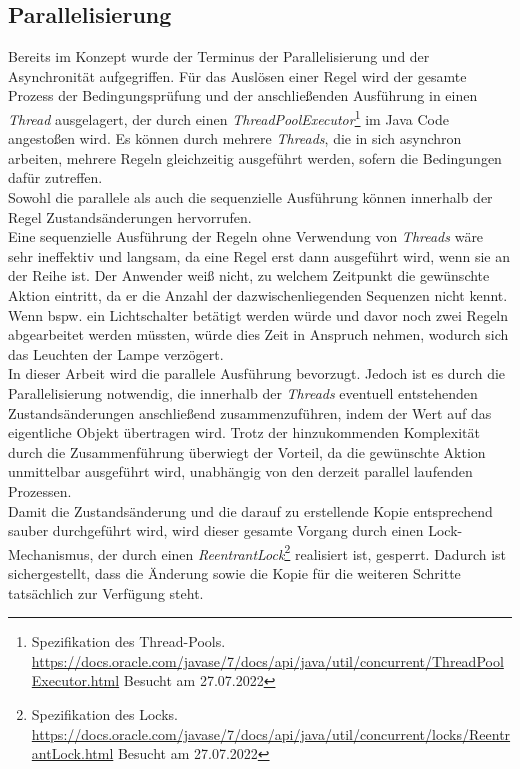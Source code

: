 \subsection{Parallelisierung}
\label{subsec:parallelisierung}
    Bereits im Konzept wurde der Terminus der Parallelisierung und der Asynchronität aufgegriffen. Für das Auslösen einer Regel wird der gesamte Prozess der 
    Bedingungsprüfung und der anschließenden Ausführung in einen \textit{Thread} ausgelagert, der durch einen 
    \textit{ThreadPoolExecutor}\footnote{Spezifikation des Thread-Pools. \url{https://docs.oracle.com/javase/7/docs/api/java/util/concurrent/ThreadPoolExecutor.html} Besucht am 27.07.2022} im Java Code angestoßen wird. 
    Es können durch mehrere \textit{Threads}, die in sich asynchron arbeiten, mehrere Regeln gleichzeitig ausgeführt werden, sofern die Bedingungen dafür zutreffen. 
    \\
    Sowohl die parallele als auch die sequenzielle Ausführung können innerhalb der Regel Zustandsänderungen hervorrufen.
    \\
    Eine sequenzielle Ausführung der Regeln ohne Verwendung von \textit{Threads} wäre sehr ineffektiv und langsam, da eine Regel erst dann ausgeführt wird, wenn sie an der Reihe ist. Der Anwender weiß nicht, zu welchem 
    Zeitpunkt die gewünschte Aktion eintritt, da er die Anzahl der dazwischenliegenden Sequenzen nicht kennt. 
    Wenn bspw. ein Lichtschalter betätigt werden würde und davor noch zwei Regeln abgearbeitet werden müssten, würde dies Zeit in Anspruch nehmen, wodurch sich das Leuchten der Lampe verzögert. 
    \\
    \linebreak 
    In dieser Arbeit wird die parallele Ausführung bevorzugt. Jedoch ist es durch die Parallelisierung 
    notwendig, die innerhalb der \textit{Threads} eventuell entstehenden Zustandsänderungen anschließend 
    zusammenzuführen, indem der Wert auf das eigentliche Objekt übertragen wird. Trotz der hinzukommenden 
    Komplexität durch die Zusammenführung überwiegt der Vorteil, da 
    die gewünschte Aktion unmittelbar ausgeführt wird, unabhängig von den derzeit parallel laufenden Prozessen. 
    \\
    Damit die Zustandsänderung und die darauf zu erstellende Kopie entsprechend sauber durchgeführt wird, wird dieser gesamte Vorgang durch einen 
    Lock-Mechanismus, der durch einen \textit{ReentrantLock}\footnote{Spezifikation des Locks. \url{https://docs.oracle.com/javase/7/docs/api/java/util/concurrent/locks/ReentrantLock.html} Besucht am 27.07.2022} 
    realisiert ist, gesperrt. Dadurch ist sichergestellt, dass die Änderung sowie die Kopie für die weiteren Schritte tatsächlich zur Verfügung steht. 
\pagebreak
